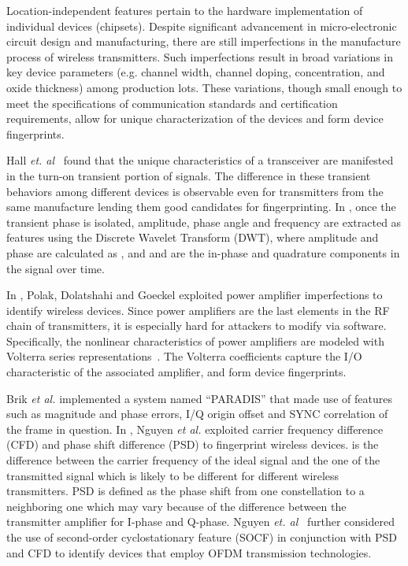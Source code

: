 \documentclass[journal,draftcls,onecolumn,11pt]{IEEEtran}
\newcounter{ctr}\setcounter{ctr}{0}
\begin{document}
Location-independent features pertain to the hardware implementation of individual devices (chipsets). Despite significant advancement in micro-electronic circuit design and manufacturing, there are still imperfections in the manufacture process of wireless transmitters\cite{Brik2008,Polak2011,Dolatshahi2010}.  Such imperfections result in broad variations in key device parameters (e.g.  channel width, channel doping, concentration, and oxide thickness) among production lots.  These variations, though small enough to meet the specifications of communication standards and certification requirements, allow for unique characterization of the devices and form device fingerprints.

Hall {\it et. al}~\cite{Hall2005} found that the unique characteristics of a transceiver are manifested in the turn-on transient portion of signals.  The difference in these transient behaviors among different devices is observable even for transmitters from the same manufacture lending them good candidates for fingerprinting. In \cite{Ureten2007,Hall2005}, once the transient phase is isolated, amplitude, phase angle and frequency are extracted as features using the Discrete Wavelet Transform (DWT), where amplitude and phase are calculated as ,  and  and  are the in-phase and quadrature components in the signal over time.

In \cite{Polak2011,Dolatshahi2010}, Polak, Dolatshahi and Goeckel exploited power amplifier imperfections to identify wireless devices. Since power amplifiers are the last elements in the RF chain of transmitters, it is especially hard for attackers to modify via software. Specifically, the nonlinear characteristics of power amplifiers are modeled with Volterra series representations~\cite{Polak2011,Dolatshahi2010}. The Volterra coefficients capture the I/O characteristic of the associated amplifier, and form device fingerprints.

Brik {\it et al.} \cite{Brik2008} implemented a system named ``PARADIS'' that made use of features such as magnitude and phase errors, I/Q origin offset and SYNC correlation of the frame in question. In \cite{Nguyen2011}, Nguyen {\it et al.}  exploited carrier frequency difference (CFD)  and phase shift difference (PSD)  to fingerprint wireless devices.   is the difference between the carrier frequency of the ideal signal and the one of the transmitted signal which is likely to be different for different wireless transmitters. PSD  is defined as the phase shift from one constellation to a neighboring one which may vary because of the difference between the transmitter amplifier for I-phase and Q-phase. Nguyen {\it et. al}~\cite{Nguyen2011} further considered the use of second-order cyclostationary feature (SOCF) in conjunction with PSD and CFD to identify devices that employ OFDM transmission technologies.
\end{document}
